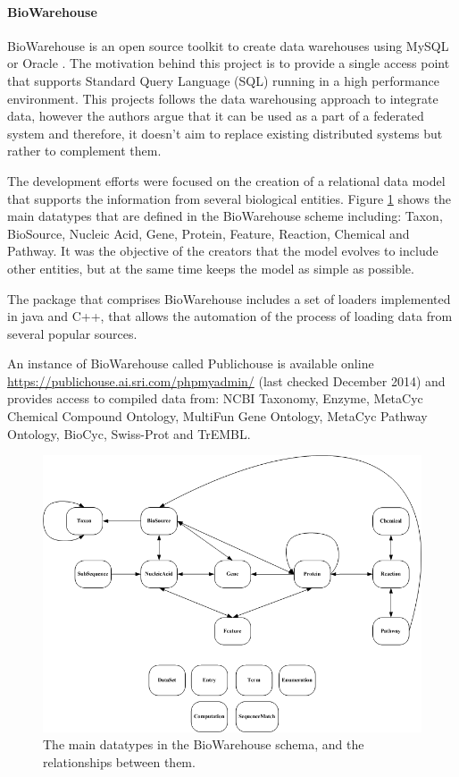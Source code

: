 \paragraph{BioWarehouse}
BioWarehouse is an open source toolkit to create data warehouses using MySQL or Oracle \cite{LEE2006}. The motivation behind this project is to provide  a single access point that supports Standard Query Language (SQL) running in a high performance environment.
This projects follows the data warehousing approach to integrate data, however the authors argue that it can be used as a part of a federated system and therefore, it doesn't aim to replace existing distributed systems but rather to complement them.

The development efforts were focused on the creation of a relational data model that supports the information from several biological entities. Figure \ref{fig:biowarehouse} shows the main datatypes that are defined in the BioWarehouse scheme including: Taxon, BioSource, Nucleic Acid, Gene, Protein, Feature, Reaction, Chemical and Pathway. It was the objective of the creators that the model evolves to include other entities, but at the same time keeps the model as simple as possible.

The package that comprises BioWarehouse includes a set of loaders implemented in java and C++, that allows the automation of the process of loading data from several popular sources. 

An instance of BioWarehouse called Publichouse is available online \url{https://publichouse.ai.sri.com/phpmyadmin/} (last checked December 2014) and provides access to compiled data from: NCBI Taxonomy, Enzyme, MetaCyc Chemical Compound Ontology, MultiFun Gene Ontology, MetaCyc Pathway Ontology, BioCyc, Swiss-Prot and TrEMBL.

\begin{figure}  
\centering
\includegraphics[width=5in]{figures/biowarehouse.png}
\caption[Original BioWarehouse schema.]{The main datatypes in the BioWarehouse schema, and the relationships between them.
\label{fig:biowarehouse}}
\end{figure}

